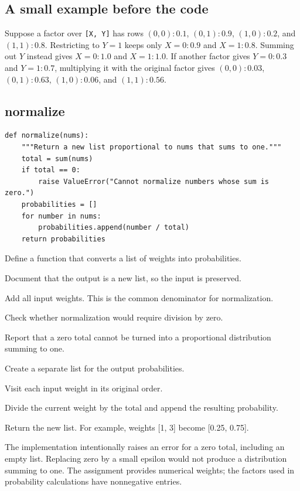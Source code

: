 \documentclass[11pt,a4paper]{article}
\begin{document}
\subsection{A small example before the code}
Suppose a factor over \texttt{[X, Y]} has rows
\((0,0):0.1\), \((0,1):0.9\), \((1,0):0.2\), and \((1,1):0.8\).
Restricting to \(Y=1\) keeps only \(X=0:0.9\) and \(X=1:0.8\).
Summing out \(Y\) instead gives \(X=0:1.0\) and \(X=1:1.0\).
If another factor gives \(Y=0:0.3\) and \(Y=1:0.7\), multiplying it with
the original factor gives \((0,0):0.03\), \((0,1):0.63\),
\((1,0):0.06\), and \((1,1):0.56\).
\subsection{normalize}
\begin{lstlisting}
def normalize(nums):
    """Return a new list proportional to nums that sums to one."""
    total = sum(nums)
    if total == 0:
        raise ValueError("Cannot normalize numbers whose sum is zero.")
    probabilities = []
    for number in nums:
        probabilities.append(number / total)
    return probabilities
\end{lstlisting}
\begin{description}[style=nextline,leftmargin=19mm,font=\normalfont\bfseries]
\item[Line 1.] Define a function that converts a list of weights into probabilities.
\item[Line 2.] Document that the output is a new list, so the input is preserved.
\item[Line 3.] Add all input weights. This is the common denominator for normalization.
\item[Line 4.] Check whether normalization would require division by zero.
\item[Line 5.] Report that a zero total cannot be turned into a proportional distribution summing to one.
\item[Line 6.] Create a separate list for the output probabilities.
\item[Line 7.] Visit each input weight in its original order.
\item[Line 8.] Divide the current weight by the total and append the resulting probability.
\item[Line 9.] Return the new list. For example, weights [1, 3] become [0.25, 0.75].
\end{description}
The implementation intentionally raises an error for a zero total, including an
empty list. Replacing zero by a small epsilon would not produce a distribution
summing to one. The assignment provides numerical weights; the factors used in
probability calculations have nonnegative entries.
\end{document}
